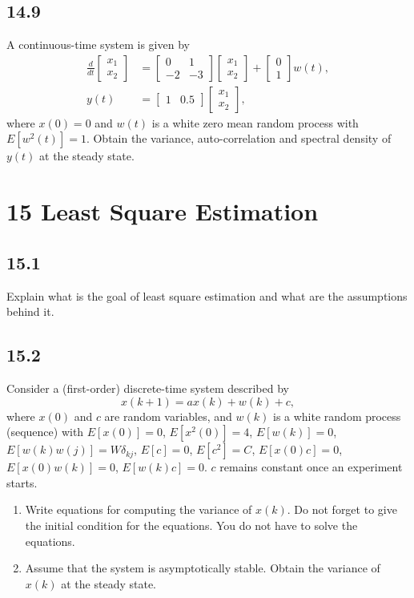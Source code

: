 \documentclass{article}
\newcommand{\problem}[2]{\subsection*{#1}}
\begin{document}
\problem{14.9}{}
A continuous-time system is given by
\[
\begin{aligned}
\frac{d}{dt}\begin{bmatrix} x_1 \\ x_2 \end{bmatrix} &=
\begin{bmatrix} 0 & 1 \\ -2 & -3 \end{bmatrix}
\begin{bmatrix} x_1 \\ x_2 \end{bmatrix} +
\begin{bmatrix} 0 \\ 1 \end{bmatrix} w(t), \\
y(t) &= \begin{bmatrix} 1 & 0.5 \end{bmatrix} \begin{bmatrix} x_1 \\ x_2 \end{bmatrix},
\end{aligned}
\]
where $x(0) = 0$ and $w(t)$ is a white zero mean random process with $E[w^2(t)] = 1$. Obtain the variance, auto-correlation and spectral density of $y(t)$ at the steady state.

\section*{15 Least Square Estimation}

\problem{15.1}{}
Explain what is the goal of least square estimation and what are the assumptions behind it.

\problem{15.2}{}
Consider a (first-order) discrete-time system described by
\[
x(k + 1) = ax(k) + w(k) + c,
\]
where $x(0)$ and $c$ are random variables, and $w(k)$ is a white random process (sequence) with $E[x(0)] = 0$, $E[x^2(0)] = 4$, $E[w(k)] = 0$, $E[w(k)w(j)] = W\delta_{kj}$, $E[c] = 0$, $E[c^2] = C$, $E[x(0)c] = 0$, $E[x(0)w(k)] = 0$, $E[w(k)c] = 0$. $c$ remains constant once an experiment starts.
\begin{enumerate}
\item Write equations for computing the variance of $x(k)$. Do not forget to give the initial condition for the equations. You do not have to solve the equations.
\item Assume that the system is asymptotically stable. Obtain the variance of $x(k)$ at the steady state.
\end{enumerate}
\end{document}
